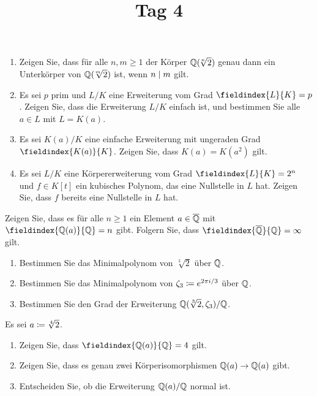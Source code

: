 \documentclass[a4paper, 10pt]{scrartcl}
\title{Tag 4}
\author{}
\date{}
\begin{document}
\begin{question}
  \begin{enumerate}
    \item
      Zeigen Sie, dass für alle $n, m \geq 1$ der Körper $\mathbb{Q}(\!\sqrt[n]{2})$ genau dann ein Unterkörper von $\mathbb{Q}(\!\sqrt[m]{2})$ ist, wenn $n \mathrel{|} m$ gilt.
    \item 
      Es sei $p$ prim und $L/K$ eine Erweiterung vom Grad $\fieldindex{L}{K} = p$.
      Zeigen Sie, dass die Erweiterung $L/K$ einfach ist, und bestimmen Sie alle $a \in L$ mit $L = K(a)$.
    \item
      Es sei $K(a)/K$ eine einfache Erweiterung mit ungeraden Grad $\fieldindex{K(a)}{K}$.
      Zeigen Sie, dass $K(a) = K(a^2)$ gilt.
    \item
      Es sei $L/K$ eine Körpererweiterung vom Grad $\fieldindex{L}{K} = 2^n$ und $f \in K[t]$ ein kubisches Polynom, das eine Nullstelle in $L$ hat.
      Zeigen Sie, dass $f$ bereits eine Nullstelle in $L$ hat.
  \end{enumerate}


\end{question}

\begin{question}
  Zeigen Sie, dass es für alle $n \geq 1$ ein Element $a \in \overline{\mathbb{Q}}$ mit $\fieldindex{\Rational(a)}{\Rational} = n$ gibt.
  Folgern Sie, dass $\fieldindex{\closure{\Rational}}{\Rational} = \infty$ gilt.
\end{question}

\begin{question}
  \begin{enumerate}
    \item
      Bestimmen Sie das Minimalpolynom von $\sqrt[3]{2}$ über $\mathbb{Q}$.
    \item
      Bestimmen Sie das Minimalpolynom von  $\zeta_3 \coloneqq e^{2 \pi i/3}$ über $\mathbb{Q}$.
    \item
      Bestimmen Sie den Grad der Erweiterung $\mathbb{Q}(\sqrt[3]{2}, \zeta_3)/\mathbb{Q}$.
  \end{enumerate}
\end{question}

\begin{question}
  Es sei $a \coloneqq \sqrt[4]{2}$.
  \begin{enumerate}
    \item
      Zeigen Sie, dass $\fieldindex{\Rational(a)}{\Rational} = 4$ gilt.
    \item
      Zeigen Sie, dass es genau zwei Körperisomorphismen $\mathbb{Q}(a) \to \mathbb{Q}(a)$ gibt.
    \item
      Entscheiden Sie, ob die Erweiterung $\mathbb{Q}(a)/\mathbb{Q}$ normal ist.
  \end{enumerate}
\end{question}
\end{document}
